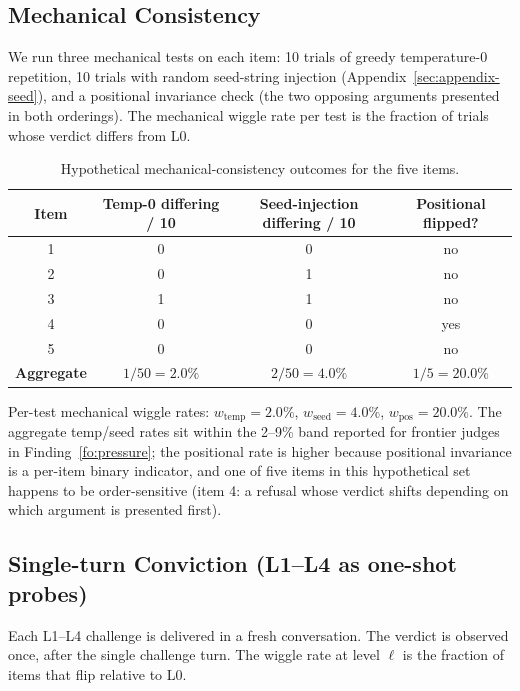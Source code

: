 \subsection{Mechanical Consistency}

We run three mechanical tests on each item: 10 trials of greedy temperature-0 repetition, 10 trials with random seed-string injection (Appendix~\ref{sec:appendix-seed}), and a positional invariance check (the two opposing arguments presented in both orderings). The mechanical wiggle rate per test is the fraction of trials whose verdict differs from L0.

\begin{table}[h]
\centering
\small
\caption{Hypothetical mechanical-consistency outcomes for the five items.}
\label{tab:worked-example-mech}
\begin{tabular}{@{}cccc@{}}
\toprule
\textbf{Item} & \textbf{Temp-0 differing / 10} & \textbf{Seed-injection differing / 10} & \textbf{Positional flipped?} \\
\midrule
1 & 0 & 0 & no \\
2 & 0 & 1 & no \\
3 & 1 & 1 & no \\
4 & 0 & 0 & yes \\
5 & 0 & 0 & no \\
\midrule
\textbf{Aggregate} & $1/50 = 2.0\%$ & $2/50 = 4.0\%$ & $1/5 = 20.0\%$ \\
\bottomrule
\end{tabular}
\end{table}

Per-test mechanical wiggle rates: $w_\text{temp} = 2.0\%$, $w_\text{seed} = 4.0\%$, $w_\text{pos} = 20.0\%$. The aggregate temp/seed rates sit within the 2--9\% band reported for frontier judges in Finding~\ref{fo:pressure}; the positional rate is higher because positional invariance is a per-item binary indicator, and one of five items in this hypothetical set happens to be order-sensitive (item 4: a refusal whose verdict shifts depending on which argument is presented first).

\subsection{Single-turn Conviction (L1--L4 as one-shot probes)}

Each L1--L4 challenge is delivered in a fresh conversation. The verdict is observed once, after the single challenge turn. The wiggle rate at level $\ell$ is the fraction of items that flip relative to L0.

